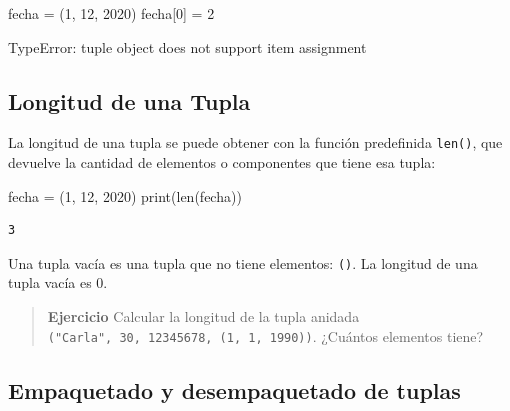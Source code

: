 \documentclass[
  letterpaper,
  DIV=11,
  numbers=noendperiod]{scrreprt}
\newenvironment{Shaded}{\begin{snugshade}}{\end{snugshade}}
\newcommand{\BuiltInTok}[1]{\textcolor[rgb]{0.00,0.23,0.31}{#1}}
\newcommand{\DecValTok}[1]{\textcolor[rgb]{0.68,0.00,0.00}{#1}}
\newcommand{\NormalTok}[1]{\textcolor[rgb]{0.00,0.23,0.31}{#1}}
\newcommand{\OperatorTok}[1]{\textcolor[rgb]{0.37,0.37,0.37}{#1}}
\begin{document}
\begin{Shaded}
\begin{Highlighting}[]
\NormalTok{fecha }\OperatorTok{=}\NormalTok{ (}\DecValTok{1}\NormalTok{, }\DecValTok{12}\NormalTok{, }\DecValTok{2020}\NormalTok{)}
\NormalTok{fecha[}\DecValTok{0}\NormalTok{] }\OperatorTok{=} \DecValTok{2}
\end{Highlighting}
\end{Shaded}

\begin{Shaded}
\begin{Highlighting}[]
\NormalTok{TypeError: \textquotesingle{}tuple\textquotesingle{} object does not support item assignment}
\end{Highlighting}
\end{Shaded}

\hypertarget{longitud-de-una-tupla}{%
\subsection{Longitud de una Tupla}\label{longitud-de-una-tupla}}

La longitud de una tupla se puede obtener con la función predefinida
\texttt{len()}, que devuelve la cantidad de elementos o componentes que
tiene esa tupla:

\begin{Shaded}
\begin{Highlighting}[]
\NormalTok{fecha }\OperatorTok{=}\NormalTok{ (}\DecValTok{1}\NormalTok{, }\DecValTok{12}\NormalTok{, }\DecValTok{2020}\NormalTok{)}
\BuiltInTok{print}\NormalTok{(}\BuiltInTok{len}\NormalTok{(fecha))}
\end{Highlighting}
\end{Shaded}

\begin{verbatim}
3
\end{verbatim}

Una tupla vacía es una tupla que no tiene elementos: \texttt{()}. La
longitud de una tupla vacía es 0.

\begin{quote}
\textbf{Ejercicio} Calcular la longitud de la tupla anidada
\texttt{("Carla",\ 30,\ 12345678,\ (1,\ 1,\ 1990))}. ¿Cuántos elementos
tiene?
\end{quote}

\hypertarget{empaquetado-y-desempaquetado-de-tuplas}{%
\subsection{Empaquetado y desempaquetado de
tuplas}\label{empaquetado-y-desempaquetado-de-tuplas}}
\end{document}
